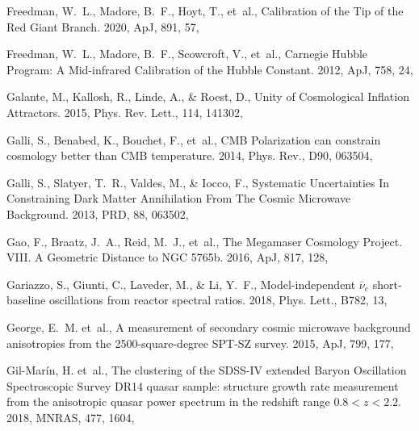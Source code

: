 \documentclass[longauth,traditabstract]{aa}
\def\apj{{ApJ}}
\def\mnras{{MNRAS}}
\def\prd{{PRD}}
\begin{document}
\begin{thebibliography}{379}
{Freedman}, W.~L., {Madore}, B.~F., {Hoyt}, T., {et~al.}, {Calibration of the
  Tip of the Red Giant Branch}. 2020, \apj, 891, 57, 

{Freedman}, W.~L., {Madore}, B.~F., {Scowcroft}, V., {et~al.}, {Carnegie Hubble
  Program: A Mid-infrared Calibration of the Hubble Constant}. 2012, \apj, 758,
  24, 

Galante, M., Kallosh, R., Linde, A., \& Roest, D., {Unity of Cosmological
  Inflation Attractors}. 2015, Phys. Rev. Lett., 114, 141302,

Galli, S., Benabed, K., Bouchet, F., {et~al.}, {CMB Polarization can constrain
  cosmology better than CMB temperature}. 2014, Phys. Rev., D90, 063504,

Galli, S., Slatyer, T.~R., Valdes, M., \& Iocco, F., {Systematic Uncertainties
  In Constraining Dark Matter Annihilation From The Cosmic Microwave
  Background}. 2013, \prd, 88, 063502, 

{Gao}, F., {Braatz}, J.~A., {Reid}, M.~J., {et~al.}, {The Megamaser Cosmology
  Project. VIII. A Geometric Distance to NGC 5765b}. 2016, \apj, 817, 128,

Gariazzo, S., Giunti, C., Laveder, M., \& Li, Y.~F., {Model-independent
  $\bar\nu_{e}$ short-baseline oscillations from reactor spectral ratios}.
  2018, Phys. Lett., B782, 13, 

George, E.~M. {et~al.}, {A measurement of secondary cosmic microwave background
  anisotropies from the 2500-square-degree SPT-SZ survey}. 2015, \apj, 799,
  177, 

Gil-Marín, H. {et~al.}, {The clustering of the SDSS-IV extended Baryon
  Oscillation Spectroscopic Survey DR14 quasar sample: structure growth rate
  measurement from the anisotropic quasar power spectrum in the redshift range
  $0.8 < z < 2.2$}. 2018, \mnras, 477, 1604, 


\end{thebibliography}
\end{document}
